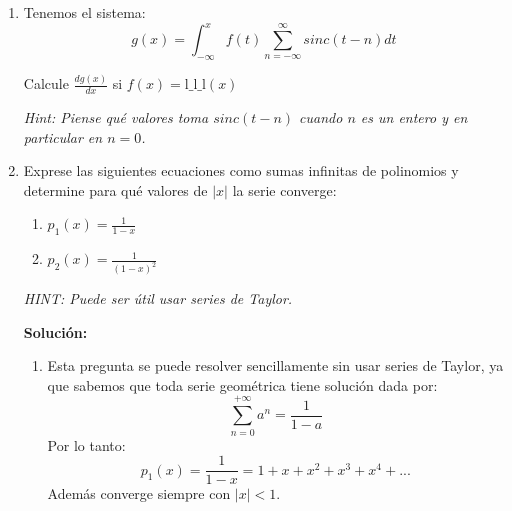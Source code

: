 \documentclass[letterpaper, 12pt]{article}
\newif\ifanswers
\begin{document}
\begin{enumerate}
{       
       }
    \fi


       \item Tenemos el sistema:
    $$ g(x) = \int_{-\infty}^{x}f(t) \sum_{n = -\infty}^{\infty}sinc(t - n)dt$$
    
    Calcule $\frac{d g(x)}{dx}$ si $f(x) = \text{l}\!\_\!\text{l}\!\_\!\text{l}(x) $
    
    \textit{Hint: Piense qué valores toma $sinc(t - n)$ cuando $n$ es un entero y en particular en $n = 0$.}



    
    \ifanswers
    {\color{red}
    \textbf{Solución:}


    \textbf{Cada sinc(x) desfasado vale 1 solo en su origen y para todos los demás enteros vale cero.}\\ Además recordando la propiedad del muestreo $\delta_a \cdot f(x) = f(a)$  podemos escribir $$g(x) = \int_{-\infty}^{x}\text{l}\!\_\!\text{l}\!\_\!\text{l}(x) = \int_{-\infty}^{x} \sum_{n = -\infty}^{\infty}\delta(x-n)$$. Podemos recordar que la integral del impulso se puede escribir como un escalón por lo que:$$g(x) =  \sum_{n = -\infty}^{\infty}u(x-n)$$. De esta forma podemos volver a derviar el sistema para llegar a que $$g(x)^{'} =\text{l}\!\_\!\text{l}\!\_\!\text{l}(x) $$}

    \fi

    \item Exprese las siguientes ecuaciones como sumas infinitas de polinomios y determine para qué valores de $|x|$ la serie converge:
    \begin{enumerate}
        \item  $p_1(x) = \frac{1}{1-x}$
        \item $p_2(x) = \frac{1}{(1-x)^2}$
    \end{enumerate}
    \textit{HINT: Puede ser útil usar series de Taylor.}

         \ifanswers
    {\color{red}
    \textbf{Solución:}
    \begin{enumerate}
        \item Esta pregunta se puede resolver sencillamente sin usar series de Taylor, ya que sabemos que toda serie geométrica tiene solución dada por:
        $$\sum_{n = 0}^{+\infty}a^n=\frac{1}{1-a}$$
        Por lo tanto:
        $$p_1(x) = \frac{1}{1-x} = 1+x+x^2+x^3+x^4+...$$
        Además converge siempre con $|x|<1$.


\end{enumerate}}
\end{enumerate}
\end{document}
